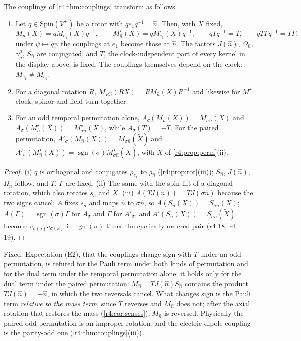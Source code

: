 \begin{proposition}
\label{r4:prop:coupclock}
The couplings of \cref{r4:thm:couplings} transform as follows.
\begin{enumerate}[label=(\roman*),leftmargin=2.2em]
\item Let $q\in\mathrm{Spin}(V^+)$ be a rotor with $qe_1q^{-1}=\hat n$. Then, with $X$ fixed,
\[
M_{\hat n}(X)=qM_{e_1}(X)q^{-1},\qquad M^\star_{\hat n}(X)=qM^\star_{e_1}(X)q^{-1},\qquad qTq^{-1}=T,\qquad qT\Gamma q^{-1}=T\Gamma :
\]
under $\psi\mapsto q\psi$ the couplings at $e_1$ become those at $\hat n$. The factors $J(\hat n)$, $\Omega_{\hat n}$, $\gamma^\mu_{\hat n}$, $S_{\hat n}$ are conjugated, and $T$, the
clock-independent part of every kernel in the display above, is fixed. The couplings themselves depend on the clock: $M_{e_1}\neq M_{e_2}$.
\item For a diagonal rotation $R$, $M_{R\hat n}(RX)=RM_{\hat n}(X)R^{-1}$ and likewise for $M^\star$: clock, spinor and field turn together.
\item For an odd temporal permutation alone, $A_\sigma(M_{\hat n}(X))=M_{\sigma \hat n}(X)$ and $A_\sigma(M^\star_{\hat n}(X))=M^\star_{\sigma \hat n}(X)$, while $A_\sigma(T)=-T$. For the paired
permutation, $A'_\sigma(M_{\hat n}(X))=M_{\sigma \hat n}(\tilde X)$ and $A'_\sigma(M^\star_{\hat n}(X))=\operatorname{sgn}(\sigma)M^\star_{\sigma \hat n}(\tilde X)$, with $\tilde X$ of \cref{r4:prop:perm}(ii).
\end{enumerate}
\end{proposition}

\begin{proof}
(i) $q$ is orthogonal and conjugates $\rho_{e_1}$ to $\rho_{\hat n}$ (\cref{r4:prop:rot}(iii)); $S_{\hat n}$, $J(\hat n)$, $\Omega_{\hat n}$ follow, and $T$, $\Gamma$ are fixed. (ii) The same with the
spin lift of a diagonal rotation, which also rotates $s_a$ and $X$. (iii) $A(TJ(\hat n))=TJ(\sigma \hat n)$ because the two signs cancel; $A$ fixes $s_a$ and maps $\hat n$ to
$\sigma \hat n$, so $A(S_{\hat n}(X))=S_{\sigma \hat n}(X)$; $A(\Gamma)=\operatorname{sgn}(\sigma)\Gamma$ for $A_\sigma$ and $\Gamma$ for $A'_\sigma$, and $A'(S_{\hat n}(X))=S_{\sigma \hat n}(\tilde X)$ because
$s_{\sigma(j)}s_{\sigma(k)}$ is $\operatorname{sgn}(\sigma)$ times the cyclically ordered pair (r4-18, r4-19).
\end{proof}

Fixed. Expectation (E2), that the couplings change sign with $T$ under an odd permutation, is refuted for the Pauli term under both kinds of
permutation and for the dual term under the temporal permutation alone; it holds only for the dual term under the paired permutation:
$M_{\hat n}=TJ(\hat n)S_{\hat n}$ contains the product $TJ(\hat n)=-\hat n$, in which the two reversals cancel. What changes sign is the
Pauli term \emph{relative to the mass term}, since $T$ reverses and $M_{\hat n}$ does not; after the axial rotation that restores the mass
(\cref{r4:cor:senses}), $M_{\hat n}$ is reversed. Physically the paired odd permutation is an improper rotation, and the electric-dipole coupling is the
parity-odd one (\cref{r4:thm:couplings}(iii)).

